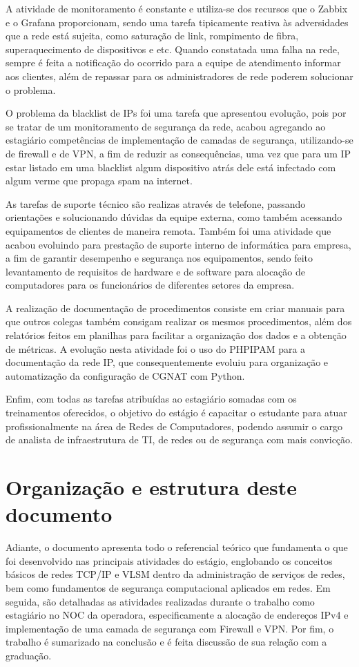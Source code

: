     A atividade de monitoramento é constante e utiliza-se dos recursos que o Zabbix e o Grafana proporcionam, sendo uma tarefa tipicamente reativa às adversidades que a rede está sujeita, como saturação de link, rompimento de fibra, superaquecimento de dispositivos e etc. Quando constatada uma falha na rede, sempre é feita a notificação do ocorrido para a equipe de atendimento informar aos clientes, além de repassar para os administradores de rede poderem solucionar o problema.
    
    O problema da blacklist de IPs foi uma tarefa que apresentou evolução, pois por se tratar de um monitoramento de segurança da rede, acabou agregando ao estagiário competências de implementação de camadas de segurança, utilizando-se de firewall e de VPN, a fim de reduzir as consequências, uma vez que para um IP estar listado em uma blacklist algum dispositivo atrás dele está infectado com algum verme que propaga spam na internet.
    
    As tarefas de suporte técnico são realizas através de telefone, passando orientações e solucionando dúvidas da equipe externa, como também acessando equipamentos de clientes de maneira remota. Também foi uma atividade que acabou evoluindo para prestação de suporte interno de informática para empresa, a fim de garantir desempenho e segurança nos equipamentos, sendo feito levantamento de requisitos de hardware e de software para alocação de computadores para os funcionários de diferentes setores da empresa.
    
    A realização de documentação de procedimentos consiste em criar manuais para que outros colegas também consigam realizar os mesmos procedimentos, além dos relatórios feitos em planilhas para facilitar a organização dos dados e a obtenção de métricas. A evolução nesta atividade foi o uso do PHPIPAM para a documentação da rede IP, que consequentemente evoluiu para organização e automatização da configuração de CGNAT com Python.
    
    Enfim, com todas as tarefas atribuídas ao estagiário somadas com os treinamentos oferecidos, o objetivo do estágio é capacitar o estudante para atuar profissionalmente na área de Redes de Computadores, podendo assumir o cargo de analista de infraestrutura de TI, de redes ou de segurança com mais convicção.

\section{Organização e estrutura deste documento}

    Adiante, o documento apresenta todo o referencial teórico que fundamenta o que foi desenvolvido nas principais atividades do estágio, englobando os conceitos básicos de redes TCP/IP e VLSM dentro da administração de serviços de redes, bem como fundamentos de segurança computacional aplicados em redes. Em seguida, são detalhadas as atividades realizadas durante o trabalho como estagiário no NOC da operadora, especificamente a alocação de endereços IPv4 e implementação de uma camada de segurança com Firewall e VPN. Por fim, o trabalho é sumarizado na conclusão e é feita discussão de sua relação com a graduação.
